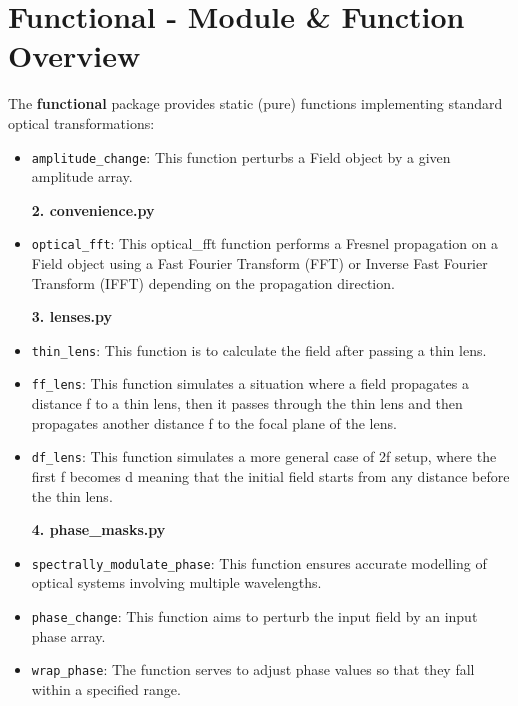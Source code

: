 \documentclass[a4paper,12pt]{report}
\begin{document}
\section{Functional - Module \& Function Overview}
The \textbf{functional} package provides static (pure) functions implementing standard optical transformations:
\begin{itemize}
    
    \vspace{1em}
    {\large \textbf{1. amplitude_masks.py}}
    \item \texttt{amplitude\_change}: This function perturbs a Field object by a given amplitude array.
    
    \vspace{1em}
    {\large \textbf{2. convenience.py}}
    \item \texttt{optical\_fft}: This optical\_fft function performs a Fresnel propagation on a Field object using a Fast Fourier Transform (FFT) or Inverse Fast Fourier Transform (IFFT) depending on the propagation direction.
    
    \vspace{1em}
    {\large \textbf{3. lenses.py}}
    \item \texttt{thin\_lens}: This function is to calculate the field after passing a thin lens.
    \item \texttt{ff\_lens}: This function simulates a situation where a field propagates a distance f to a thin lens, then it passes through the thin lens and then propagates another distance f to the focal plane of the lens.
    \item \texttt{df\_lens}: This function simulates a more general case of 2f setup, where the first f becomes d meaning that the initial field starts from any distance before the thin lens.
    
    \vspace{1em}
    {\large \textbf{4. phase\_masks.py}}
    \item \texttt{spectrally\_modulate\_phase}: This function ensures accurate modelling of optical systems involving multiple wavelengths.
    \item \texttt{phase\_change}: This function aims to perturb the input field by an input phase array.
    \item \texttt{wrap\_phase}: The function serves to adjust phase values so that they fall within a specified range.
    

\end{itemize}
\end{document}

